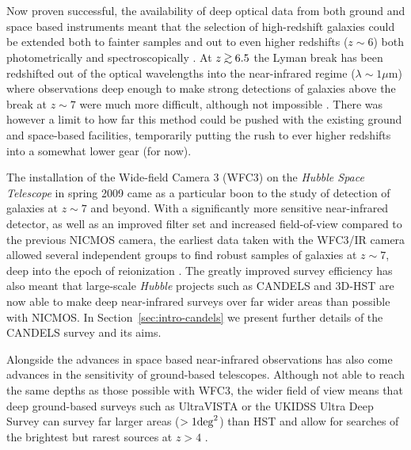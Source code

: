 Now proven successful, the availability of deep optical data from both ground and space based instruments meant that the selection of high-redshift galaxies could be extended both to fainter samples and out to even higher redshifts ($z\sim6$) both photometrically \citep{1999ApJ...519....1S, Thompson:2001da, Thompson:2003dp, Fontana:2003ch, Stanway:2003fx, Giavalisco:2004et, Dickinson:2004ba, Capak:2004im} and spectroscopically \citep{Bunker:2003hc,Stanway:2004kr,Stanway:2004gu}. At $z\simgreat 6.5$ the Lyman break has been redshifted out of the optical wavelengths into the near-infrared regime ($\lambda \sim 1\mu$m) where observations deep enough to make strong detections of galaxies above the break at $z\sim7$ were much more difficult, although not impossible \citep{Bouwens:2004gn}. There was however a limit to how far this method could be pushed with the existing ground and space-based facilities, temporarily putting the rush to ever higher redshifts into a somewhat lower gear (for now).

The installation of the Wide-field Camera 3 (WFC3) on the \emph{Hubble Space Telescope} in spring 2009 came as a particular boon to the study of detection of galaxies at $z\sim7$ and beyond. With a significantly more sensitive near-infrared detector, as well as an improved filter set and increased field-of-view compared to the previous NICMOS camera, the earliest data taken with the WFC3/IR camera allowed several independent groups to find robust samples of galaxies at $z\sim7$, deep into the epoch of reionization \citep{Bunker:2010gx, Finkelstein:2010fw, 2011A&A...532A..33G, Labbe:2010ho,2010ApJ...709L..21O,2012ApJ...759..135O,Bouwens:2010dk,2011ApJ...737...90B}. The greatly improved survey efficiency has also meant that large-scale \emph{Hubble} projects such as CANDELS \citep{2011ApJS..197...35G} and 3D-HST \citep{Brammer:2012bu} are now able to make deep near-infrared surveys over far wider areas than possible with NICMOS. In Section~\ref{sec:intro-candels} we present further details of the CANDELS survey and its aims.

Alongside the advances in space based near-infrared observations has also come advances in the sensitivity of ground-based telescopes. Although not able to reach the same depths as those possible with WFC3, the wider field of view means that deep ground-based surveys such as UltraVISTA \citep{McCracken:2012gd} or the UKIDSS Ultra Deep Survey \citep{Lawrence:2007hu,Cirasuolo:2007bz} can survey far larger areas ($>1 \rm{deg}^{2}$) than HST and allow for searches of the brightest but rarest sources at $z > 4$ \citep{McLure:2006fg,2009MNRAS.395.2196M,2010A&A...524A..28C}.


